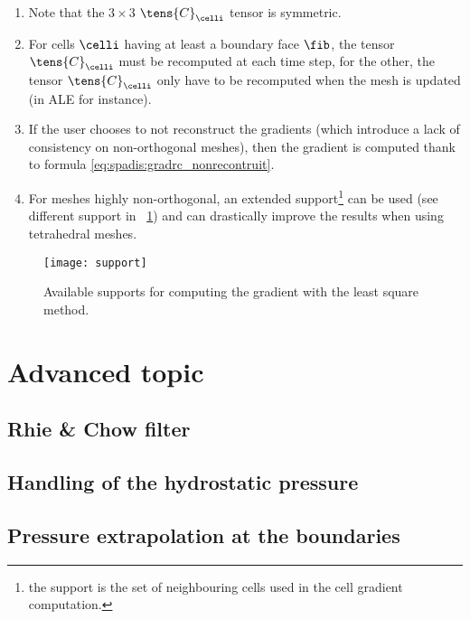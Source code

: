 \begin{remark}
\begin{enumerate}[ label=\roman{*}/, ref=(\roman{*})]
\item Note that the $3\times3$ $\tens{C}_\celli$ tensor is symmetric.
\item For cells $\celli$ having at least a boundary face $\fib$, the tensor $\tens{C}_\celli$ must be recomputed at each time step,
for the other, the tensor $\tens{C}_\celli$ only have to be recomputed when the mesh is updated (in ALE for instance).
\item If the user chooses to not reconstruct the gradients (which introduce a lack of consistency on non-orthogonal meshes),
then the gradient is computed thank to formula \eqref{eq:spadis:gradrc_nonrecontruit}.
\item For meshes highly non-orthogonal, an extended support\footnote{
the support is the set of neighbouring cells used in the cell gradient computation.
} can be used (see different support in \figurename~\ref{fig:spadis:gradmc_support}) and can drastically improve the results when using tetrahedral meshes. 
\end{enumerate}
\end{remark}

\begin{figure}[!htp]
\centerline{\texttt{[image: support]}}
\caption{Available supports for computing the gradient with the least square method.\label{fig:spadis:gradmc_support}}
\end{figure}









\section{Advanced topic}

\subsection{Rhie \& Chow filter}


\subsection{Handling of the hydrostatic pressure}

\subsection{Pressure extrapolation at the boundaries}


